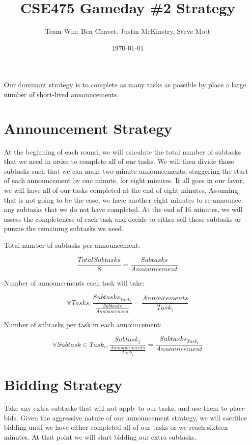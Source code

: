 \documentclass{article}
\title{CSE475 Gameday \#2 Strategy}
\author{Team Win: Ben Chavet, Justin McKinstry, Steve Mott}
\date{\today}
\begin{document}
\maketitle

Our dominant strategy is to complete as many tasks as possible by
place a large number of short-lived announcements.

\section{Announcement Strategy}

At the beginning of each round, we will calculate the total number of subtasks
that we need in order to complete all of our tasks.  We will then divide those
subtasks such that we can make two-minute announcements, staggering the start
of each announcement by one minute, for eight minutes.  If all goes in our favor,
we will have all of our tasks completed at the end of eight minutes.  Assuming
that is not going to be the case, we have another eight minutes to re-announce
any subtasks that we do not have completed.  At the end of 16 minutes, we will
assess the completeness of each task and decide to either sell those subtasks
or pursue the remaining subtasks we need.

Total number of subtasks per announcement:

\[ \frac{TotalSubtasks}{8} = \frac{Subtasks}{Announcement} \]

Number of announcements each task will take:

\[ \forall{Tasks}, \frac{Subtasks_{Task_i}}{\frac{Subtasks}{Announcement}} = \frac{Annoucements}{Task_i} \]

Number of subtasks per task in each announcement:

\[ \forall{Subtask \in Task_i}, \frac{Subtask_j}{\frac{Announcements}{Task_i}} = \frac{Subtasks_{Task_i}}{Announcement} \]

\section{Bidding Strategy}

Take any extra subtasks that will not apply to our tasks, and use them to
place bids.  Given the aggressive nature of our announcement strategy,
we will sacrifice bidding until we have either completed all of our tasks
or we reach sixteen minutes.  At that point we will start bidding our
extra subtasks.
\end{document}
